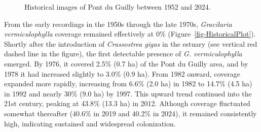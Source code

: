 \documentclass[
  letterpaper,
  DIV=11,
  numbers=noendperiod]{scrartcl}
\begin{document}
\label{cell-fig-HistoricalMap}
\begin{figure}[H]


\caption{\label{fig-HistoricalMap}Historical images of Pont du Guilly
between 1952 and 2024.}

\end{figure}%

From the early recordings in the 1950s through the late 1970s,
\emph{Gracilaria vermiculophylla} coverage remained effectively at 0\%
(Figure~\ref{fig-HistoricalPlot}). Shortly after the introduction of
\emph{Crassostrea gigas} in the estuary (see vertical red dashed line in
the figure), the first detectable presence of \emph{G. vermiculophylla}
emerged. By 1976, it covered 2.5\% (0.7 ha) of the Pont du Guilly area,
and by 1978 it had increased slightly to 3.0\% (0.9 ha). From 1982
onward, coverage expanded more rapidly, increasing from 6.6\% (2.0 ha)
in 1982 to 14.7\% (4.5 ha) in 1992 and nearly 30\% (9.0 ha) by 1997.
This upward trend continued into the 21st century, peaking at 43.8\%
(13.3 ha) in 2012. Although coverage fluctuated somewhat thereafter
(40.6\% in 2019 and 40.2\% in 2024), it remained consistently high,
indicating sustained and widespread colonization.
\end{document}
